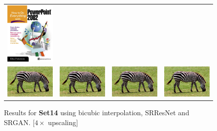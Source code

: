 \documentclass[10pt,twocolumn,letterpaper]{article}
\begin{document}
\begin{figure}[h!]
\begin{tabular}{cccc}
     	\includegraphics[width=1.5in]{images/used/appendix/jpg/Set14/ppt3_HR} \\     	
     	\includegraphics[width=1.5in]{images/used/appendix/jpg/Set14/zebra_bicubic}&
     	\includegraphics[width=1.5in]{images/used/appendix/jpg/Set14/zebra_SRResNet-MSE} &
     	\includegraphics[width=1.5in]{images/used/appendix/jpg/Set14/zebra_SRGAN-VGG54} &   
     	\includegraphics[width=1.5in]{images/used/appendix/jpg/Set14/zebra_HR} \\     	  	     
  	\end{tabular}
  	\label{fig:app_Set14c}
  	\caption{Results for \textbf{Set14} using bicubic interpolation, SRResNet and SRGAN. [$4\times$ upscaling]} 
\end{figure}
\clearpage
\end{document}
